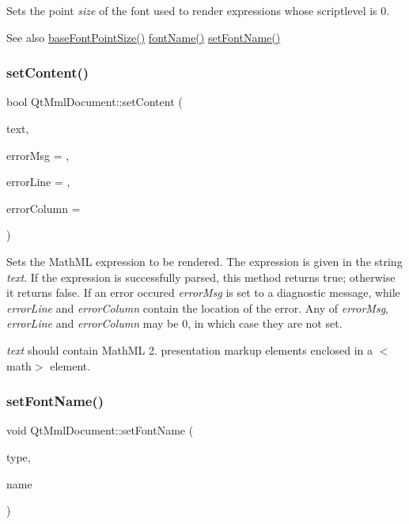 Sets the point {\itshape size} of the font used to render expressions whose scriptlevel is 0.

\begin{DoxySeeAlso}{See also}
\mbox{\hyperlink{class_qt_mml_document_a6988266de54f91cdc03e3d20915828c1}{base\+Font\+Point\+Size()}} \mbox{\hyperlink{class_qt_mml_document_aee262410ce903f2a58c1eac22311266a}{font\+Name()}} \mbox{\hyperlink{class_qt_mml_document_a6e722bc5c964444616ef4d9e640d9350}{set\+Font\+Name()}} 
\end{DoxySeeAlso}
\mbox{\label{class_qt_mml_document_a08e287efbea760c51f22fec4a4c5067e}} 
\subsubsection{\texorpdfstring{set\+Content()}{setContent()}}
{\footnotesize\ttfamily bool Qt\+Mml\+Document\+::set\+Content (\begin{DoxyParamCaption}\item[{Q\+String}]{text,  }\item[{Q\+String $\ast$}]{error\+Msg = {},  }\item[{int $\ast$}]{error\+Line = {},  }\item[{int $\ast$}]{error\+Column = {} }\end{DoxyParamCaption})}

Sets the Math\+ML expression to be rendered. The expression is given in the string {\itshape text}. If the expression is successfully parsed, this method returns true; otherwise it returns false. If an error occured {\itshape error\+Msg} is set to a diagnostic message, while {\itshape error\+Line} and {\itshape error\+Column} contain the location of the error. Any of {\itshape error\+Msg}, {\itshape error\+Line} and {\itshape error\+Column} may be 0, in which case they are not set.

{\itshape text} should contain Math\+ML 2. presentation markup elements enclosed in a $<$math$>$ element. \mbox{\label{class_qt_mml_document_a6e722bc5c964444616ef4d9e640d9350}} 
\subsubsection{\texorpdfstring{set\+Font\+Name()}{setFontName()}}
{\footnotesize\ttfamily void Qt\+Mml\+Document\+::set\+Font\+Name (\begin{DoxyParamCaption}\item[{\mbox{\hyperlink{class_qt_mml_widget_ac3fde39f7b605557d80bded69f985d2a}{Qt\+Mml\+Widget\+::\+Mml\+Font}}}]{type,  }\item[{const Q\+String \&}]{name }\end{DoxyParamCaption})}

